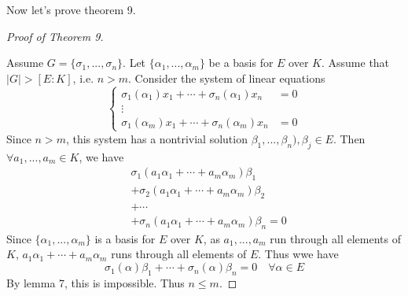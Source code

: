 \documentclass{article}
\theoremstyle{definition}
\newenvironment{proofs}[1][\proofname]{%
  \begin{proof}[#1]$ $\par\nobreak\ignorespaces
}{%
  \end{proof}
}
\begin{document}
Now let's prove theorem 9.
\begin{proofs}[Proof of Theorem 9]
	Assume $G = \{\sigma_1, ..., \sigma_n\}$.
	Let $\{\alpha_1, ..., \alpha_m\}$ be a basis for $E$ over $K$.
	Assume that $|G| > [E:K]$, i.e. $n > m$.
	Consider the system of linear equations
	\[
		\left\{
			\begin{split}
				\sigma_1(\alpha_1)x_1 + \cdots + \sigma_n(\alpha_1) x_n & = 0\\
				\vdots \quad \quad \quad \quad \quad  \\
				\sigma_1(\alpha_m)x_1 + \cdots + \sigma_n( \alpha_m) x_n & = 0
			\end{split}
		\right.
	\]
	Since $n > m$, this system has a nontrivial solution $\beta_1, ..., \beta_n), \beta_j \in E$.
	Then $\forall a_1, ..., a_m \in K$, we have
	\[
		\begin{split}
			&\sigma_1(a_1 \alpha_1 + \cdots + a_m \alpha_m) \beta_1 \\
			&+ \sigma_2(a_1 \alpha_1 + \cdots + a_m \alpha_m)\beta_2\\
			&+ \cdots \quad \quad \quad \\
			&+ \sigma_n (a_1 \alpha_1 +\cdots + a_m \alpha_m) \beta_n = 0
		\end{split}
	\]
	Since $\{\alpha_1, ..., \alpha_m\}$ is a basis for $E$ over $K$, as $a_1, ..., a_m$ run through all elements of $K$, $a_1 \alpha_1 + \cdots + a_m \alpha_m$ runs through all elements of $E$.
	Thus wwe have
	\[
		\sigma_1(\alpha) \beta_1 + \cdots + \sigma_n(\alpha) \beta_n = 0 \quad \forall \alpha \in E
	\]
	By lemma  7, this is impossible.
	Thus $n \leq m$.

\end{proofs}
\end{document}
